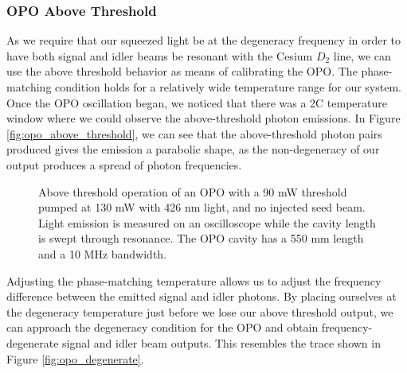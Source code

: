 \subsubsection{OPO Above Threshold} 
\label{opo_above_threshold} 

As we require that our squeezed light be at the degeneracy frequency in order to have both signal and idler beams be resonant with the Cesium $D_2$ line,  we can use the above threshold behavior as means of calibrating the OPO.  The phase-matching condition holds for a relatively wide temperature range for our system.  Once the OPO oscillation began, we noticed that there was a 2\textdegree C temperature window where we could observe the above-threshold photon emissions.  In Figure \ref{fig:opo_above_threshold}, we can see that the above-threshold photon pairs produced gives the emission a parabolic shape, as the non-degeneracy of our output produces a spread of photon frequencies.


\begin{figure}[!ht]
  \centering
  \caption[OPO above-threshold operation]{Above threshold operation of an OPO
  with a 90 mW threshold pumped at 130 mW with 426 nm light, and no injected
  seed beam.  Light emission is measured on an oscilloscope while the cavity
  length is swept through resonance.  The OPO cavity has a 550 mm length and a
  10 MHz bandwidth. }  
  \label{fig:opo_above_threshold_modes}
\end{figure}


Adjusting the phase-matching temperature allows us to adjust the frequency difference between the emitted signal and idler photons.  By placing ourselves at the degeneracy temperature just before we lose our above threshold output, we can approach the degeneracy condition for the OPO and obtain frequency-degenerate signal and idler beam outputs.  This resembles the trace shown in Figure \ref{fig:opo_degenerate}.
  

